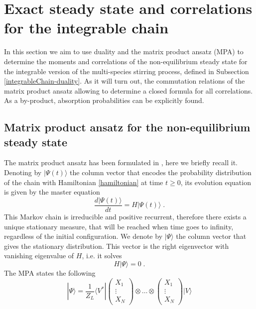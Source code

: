 \documentclass[10pt]{article}
\numberwithin{equation}{section}
\numberwithin{equation}{subsection}
\newcommand{\dt}{\;.}
\begin{document}
\section{Exact steady state and correlations for the integrable chain}\label{sectionIntegrabiliy}
In this section we aim to use duality and the matrix product ansatz (MPA) to determine the moments and correlations of the non-equilibrium steady state for the integrable version of the multi-species stirring process, defined in Subsection \ref{integrableChain-duality}. As it will turn out, the commutation relations of the matrix product ansatz allowing to determine a closed formula for all correlations. As a by-product, absorption probabilities can be explicitly found.%
\subsection{Matrix product ansatz for the non-equilibrium steady state}
The matrix product ansatz has been formulated in \cite{vanicat2017exact}, here we briefly recall it.
 Denoting by $|\Psi(t)\rangle$ the column vector that encodes the probability distribution of the chain with Hamiltonian \eqref{hamiltonian} at time $t\geq 0$, its evolution equation is given by 
 the master equation
\begin{equation}
    \frac{d|{\Psi}(t)\rangle}{dt}=H|{\Psi}(t)\rangle\dt
\end{equation}
This Markov chain is irreducible and positive recurrent, therefore there exists a unique stationary measure, that will be reached when time goes to infinity, regardless of the initial configuration. 
We denote by $|\Psi\rangle$ the column vector that gives the stationary distribution. This vector is the right eigenvector with vanishing eigenvalue of $H$, i.e. it solves 
\begin{equation}\label{definition-SteadyStateH}
	H|\Psi\rangle =0\dt
\end{equation}
The MPA states the following
\begin{equation}
	|\Psi\rangle=\frac{1}{Z_{L}}\langle V^{*}|\begin{pmatrix}
		X_{1}\\
		\vdots\\
		X_{N}
	\end{pmatrix}\otimes \ldots\otimes \begin{pmatrix}
		X_{1}\\
		\vdots\\
		X_{N}
	\end{pmatrix}|V\rangle
\end{equation}
\end{document}

